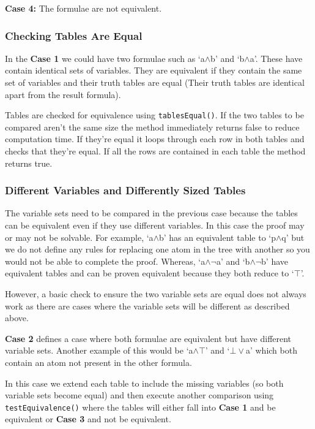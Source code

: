 \documentclass{report}
\begin{document}
\textbf{Case 4: } The formulae are not equivalent.

\subsubsection{Checking Tables Are Equal}

In the \textbf{Case 1} we could have two formulae such as `a$\land$b' and `b$\land$a'. These have contain identical sets of variables. They are equivalent if they contain the same set of variables and their truth tables are equal (Their truth tables are identical apart from the result formula).

Tables are checked for equivalence using {\tt tablesEqual()}. If the two tables to be compared aren't the same size the method immediately returns false to reduce computation time. If they're equal it loops through each row in both tables and checks that they're equal. If all the rows are contained in each table the method returns true.

\subsubsection{Different Variables and Differently Sized Tables}

The variable sets need to be compared in the previous case because the tables can be equivalent even if they use different variables. In this case the proof may or may not be solvable. For example, `a$\land$b' has an equivalent table to `p$\land$q' but we do not define any rules for replacing one atom in the tree with another so you would not be able to complete the proof. Whereas, `a$\land\lnot$a' and `b$\land\lnot$b' have equivalent tables and can be proven equivalent because they both reduce to `$\top$'.

However, a basic check to ensure the two variable sets are equal does not always work as there are cases where the variable sets will be different as described above. 

\textbf{Case 2} defines a case where both formulae are equivalent but have different variable sets. Another example of this would be `a$\land\top$' and `$\bot\lor$a' which both contain an atom not present in the other formula.

In this case we extend each table to include the missing variables (so both variable sets become equal) and then execute another comparison using {\tt testEquivalence()} where the tables will either fall into \textbf{Case 1} and be equivalent or \textbf{Case 3} and not be equivalent. 
\end{document}
